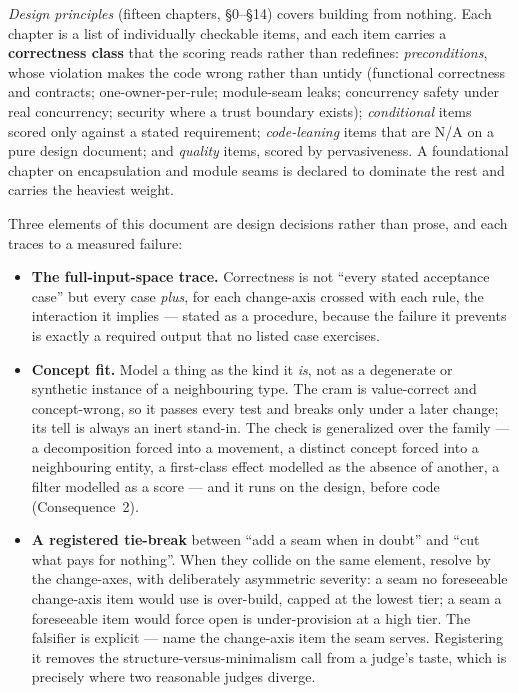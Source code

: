 \documentclass[11pt]{article}
\begin{document}
\emph{Design principles} (fifteen chapters, \S0--\S14) covers building from nothing. Each chapter is a list of individually checkable items, and each item carries a \textbf{correctness class} that the scoring reads rather than redefines: \emph{preconditions}, whose violation makes the code wrong rather than untidy (functional correctness and contracts; one-owner-per-rule; module-seam leaks; concurrency safety under real concurrency; security where a trust boundary exists); \emph{conditional} items scored only against a stated requirement; \emph{code-leaning} items that are N/A on a pure design document; and \emph{quality} items, scored by pervasiveness. A foundational chapter on encapsulation and module seams is declared to dominate the rest and carries the heaviest weight.

Three elements of this document are design decisions rather than prose, and each traces to a measured failure:
\begin{itemize}[leftmargin=*,itemsep=2pt]
\item \textbf{The full-input-space trace.} Correctness is not ``every stated acceptance case'' but every case \emph{plus}, for each change-axis crossed with each rule, the interaction it implies --- stated as a procedure, because the failure it prevents is exactly a required output that no listed case exercises.
\item \textbf{Concept fit.} Model a thing as the kind it \emph{is}, not as a degenerate or synthetic instance of a neighbouring type. The cram is value-correct and concept-wrong, so it passes every test and breaks only under a later change; its tell is always an inert stand-in. The check is generalized over the family --- a decomposition forced into a movement, a distinct concept forced into a neighbouring entity, a first-class effect modelled as the absence of another, a filter modelled as a score --- and it runs on the design, before code (Consequence~2).
\item \textbf{A registered tie-break} between ``add a seam when in doubt'' and ``cut what pays for nothing''. When they collide on the same element, resolve by the change-axes, with deliberately asymmetric severity: a seam no foreseeable change-axis item would use is over-build, capped at the lowest tier; a seam a foreseeable item would force open is under-provision at a high tier. The falsifier is explicit --- name the change-axis item the seam serves. Registering it removes the structure-versus-minimalism call from a judge's taste, which is precisely where two reasonable judges diverge.
\end{itemize}
\end{document}

